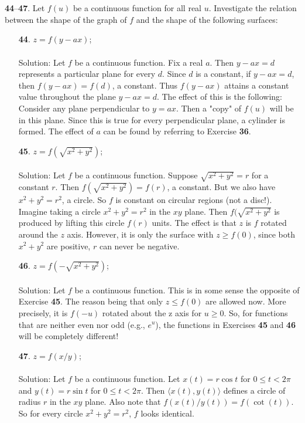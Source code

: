 \documentclass[12pt]{amsbook}
\newcommand{\la}{\langle}
\newcommand{\ra}{\rangle}
\begin{document}
\\
\\
\noindent
{\small {\bf 44}--{\bf 47}}. Let $f(u)$ be a continuous function for all real $u$. Investigate the relation between the shape of the graph of $f$ and the shape of the following
surfaces:
\begin{enumerate}
  \item[{\small\bf 44}.] $z=f(y-ax)$;
  \\
  \\
  {\sc Solution}: Let $f$ be a continuous function. Fix a real $a$. Then $y-ax=d$ represents a particular plane for every $d$. Since $d$ is a constant, if $y-ax=d$, then $f(y-ax)=f(d)$, a constant. Thus $f(y-ax)$ attains a constant value throughout the plane $y-ax=d$. The effect of this is the following: Consider any plane perpendicular to $y=ax$. Then a "copy" of $f(u)$ will be in this plane. Since this is true for every perpendicular plane, a cylinder is formed. The effect of $a$ can be found by referring to Exercise {\bf 36}.
  \\
  \item[{\small\bf 45}.] $z=f(\sqrt{x^2+y^2})$;
  \\
  \\
  {\sc Solution}: Let $f$ be a continuous function. Suppose $\sqrt{x^2+y^2}=r$ for a constant $r$. Then $f(\sqrt{x^2+y^2})=f(r)$, a constant. But we also have $x^2+y^2=r^2$, a circle. So $f$ is constant on circular regions (not a disc!). Imagine taking a circle $x^2+y^2=r^2$ in the $xy$ plane. Then $f(\sqrt{x^2+y^2}$ is produced by lifting this circle $f(r)$ units. The effect is that $z$ is $f$ rotated around the $z$ axis. However, it is only the surface with $z\geq f(0)$, since both $x^2+y^2$ are positive, $r$ can never be negative.
  \\
  \item[{\small\bf 46}.] $z=f(-\sqrt{x^2+y^2})$;
  \\
  \\
  {\sc Solution}: Let $f$ be a continuous function. This is in some sense the opposite of Exercise {\bf 45}. The reason being that only $z \leq f(0)$ are allowed now. More precisely, it is $f(-u)$ rotated about the z axis for $u \geq 0$. So, for functions that are neither even nor odd (e.g., $e^u$), the functions in Exercises {\bf 45} and {\bf 46} will be completely different!
  \\
  \item[{\small\bf 47}.] $z=f(x/y)$;
  \\
  \\
  {\sc Solution}: Let $f$ be a continuous function. Let $x(t)=r \cos t$ for $0 \leq t < 2\pi$ and  $y(t)=r \sin t$ for $0 \leq t < 2\pi$. Then $\la x(t),y(t) \ra$ defines a circle of radius $r$ in the $xy$ plane. Also note that $f(x(t)/y(t))=f(\cot(t))$. So for every circle $x^2+y^2=r^2$, $f$ looks identical.
  \\
\end{enumerate}
\end{document}
